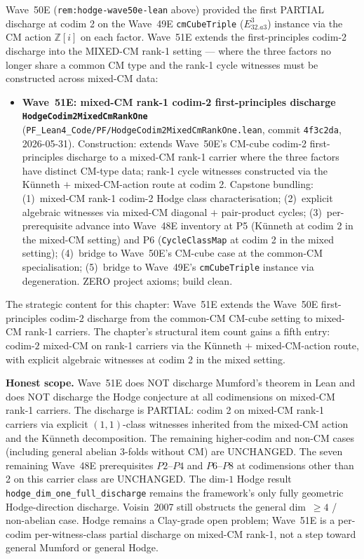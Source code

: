 \begin{remark}\label{rem:hodge-wave51e-lean}
Wave~50E (\texttt{rem:hodge-wave50e-lean} above) provided the first PARTIAL discharge at codim 2 on the Wave~49E \texttt{cmCubeTriple} ($E_{32.a3}^3$) instance via the CM action $\mathbb{Z}[i]$ on each factor. Wave~51E extends the first-principles codim-2 discharge into the MIXED-CM rank-1 setting --- where the three factors no longer share a common CM type and the rank-1 cycle witnesses must be constructed across mixed-CM data:
\begin{itemize}
  \item \textbf{Wave~51E: mixed-CM rank-1 codim-2 first-principles discharge \texttt{HodgeCodim2MixedCmRankOne}} (\texttt{PF\_Lean4\_Code/PF/HodgeCodim2MixedCmRankOne.lean}, commit \texttt{4f3c2da}, 2026-05-31). Construction: extends Wave~50E's CM-cube codim-2 first-principles discharge to a mixed-CM rank-1 carrier where the three factors have distinct CM-type data; rank-1 cycle witnesses constructed via the K\"unneth $+$ mixed-CM-action route at codim 2. Capstone bundling: (1)~mixed-CM rank-1 codim-2 Hodge class characterisation; (2)~explicit algebraic witnesses via mixed-CM diagonal $+$ pair-product cycles; (3)~per-prerequisite advance into Wave~48E inventory at P5 (K\"unneth at codim 2 in the mixed-CM setting) and P6 (\texttt{CycleClassMap} at codim 2 in the mixed setting); (4)~bridge to Wave~50E's CM-cube case at the common-CM specialisation; (5)~bridge to Wave~49E's \texttt{cmCubeTriple} instance via degeneration. ZERO project axioms; build clean.
\end{itemize}
The strategic content for this chapter: Wave~51E extends the Wave~50E first-principles codim-2 discharge from the common-CM CM-cube setting to mixed-CM rank-1 carriers. The chapter's structural item count gains a fifth entry: codim-$2$ mixed-CM on rank-1 carriers via the K\"unneth $+$ mixed-CM-action route, with explicit algebraic witnesses at codim 2 in the mixed setting.

\textbf{Honest scope.} Wave~51E does NOT discharge Mumford's theorem in Lean and does NOT discharge the Hodge conjecture at all codimensions on mixed-CM rank-1 carriers. The discharge is PARTIAL: codim 2 on mixed-CM rank-1 carriers via explicit $(1, 1)$-class witnesses inherited from the mixed-CM action and the K\"unneth decomposition. The remaining higher-codim and non-CM cases (including general abelian 3-folds without CM) are UNCHANGED. The seven remaining Wave~48E prerequisites $P2$--$P4$ and $P6$--$P8$ at codimensions other than 2 on this carrier class are UNCHANGED. The dim-$1$ Hodge result \texttt{hodge\_dim\_one\_full\_discharge} remains the framework's only fully geometric Hodge-direction discharge. Voisin~2007 still obstructs the general dim~$\geq 4$ / non-abelian case. Hodge remains a Clay-grade open problem; Wave~51E is a per-codim per-witness-class partial discharge on mixed-CM rank-1, not a step toward general Mumford or general Hodge.
\end{remark}

